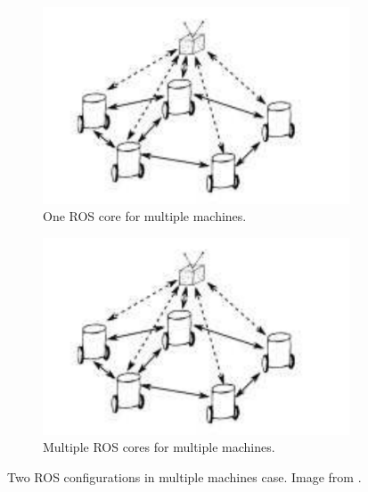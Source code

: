 \documentclass[11pt,openany]{book}
\begin{document}
\begin{algorimth}[H]
\begin{figure}[H]
\begin{subfigure}[H]{0.4\linewidth}
        \includegraphics[width=\linewidth]{assets/4_8_a.png}
        \caption{{One ROS core for multiple machines.}}
        \label{fig:4.8a}
    \end{subfigure}
    \begin{subfigure}[H]{0.4\linewidth}
        \includegraphics[width=\linewidth]{assets/4_8_a.png}
        \caption{{Multiple ROS cores for multiple machines.}}
        \label{fig:4.8b}
    \end{subfigure}
    \caption{{Two ROS conﬁgurations in multiple machines case. Image from \cite{andre2014coordinated}.}}
    \label{fig:4.8}
\end{figure}

\end{algorimth}
\end{document}
